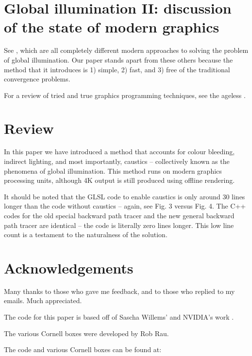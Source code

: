 \documentclass[12pt]{article}
\begin{document}
\section{Global illumination II: discussion of the state of modern graphics}

See \cite{moreau, komarov, gruen, yang}, which are all completely different modern approaches to solving the problem of global illumination.
Our paper stands apart from these others because the method that it introduces is 1) simple, 2) fast, and 3) free of the traditional convergence problems.

For a review of tried and true graphics programming techniques, see the ageless \cite{pharr}.





\section{Review}

In this paper we have introduced a method that accounts for colour bleeding, indirect lighting, and most importantly, caustics -- collectively known as the phenomena of global illumination.
This method runs on modern graphics processing units, although 4K output is still produced using offline rendering.

It should be noted that the GLSL code to enable caustics is only around $30$ lines longer than the code without caustics -- again, see Fig. 3 versus Fig. 4.
The C++ codes for the old special backward path tracer and the new general backward path tracer are identical -- the code is literally zero lines longer.
This low line count is a testament to the naturalness of the solution.






\section{Acknowledgements}

Many thanks to those who gave me feedback, and to those who replied to my emails.
Much appreciated.

The code for this paper is based off of Sascha Willems' and NVIDIA's work \cite{willems1, willems2, nvidia}.

The various Cornell boxes were developed by Rob Rau.

The code and various Cornell boxes can be found at: 
\end{document}
